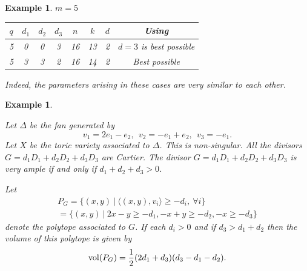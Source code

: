 \documentclass[12pt]{article}
\newtheorem{example}[theorem]{Example}
\begin{document}
\begin{example}
$m=5$ 

\begin{center}
\begin{tabular}{|c|c|c|c|c|c|c|c|}\hline
$q$ & $d_1$ & $d_2$ & $d_3$ & $n$ & $k$ & $d$ & Using \cite{B} \\ \hline
5    & 0  &  0 & 3  & 16  & 13 & 2 & $d=3$ is best possible  \\
5    & 3  &  3 & 2  & 16  & 14 & 2 & Best possible  \\
\hline
\end{tabular}
\end{center}

Indeed, the parameters arising in these cases are very similar
to each other.
\end{example}


\begin{example}
\label{example:fan6}

Let $\Delta$ be the fan generated by 
\[
v_1=2e_1-e_2,\ \ v_2=-e_1+e_2,\ \ v_3=-e_1.
\]
Let $X$ be the toric variety associated to $\Delta$.
This is non-singular.
All the divisors $G=d_1D_1+d_2D_2+d_3D_3$
are Cartier.
The divisor $G=d_1D_1+d_2D_2+d_3D_3$
is very ample if and only if $d_1+d_2+d_3>0$.

Let 
\[
\begin{array}{c}
P_G=\{(x,y)\ |\ \langle (x,y),v_i\rangle \geq -d_i, \ \forall i\}\\
=\{(x,y)\ |\ 2x-y \geq -d_1, -x+y \geq -d_2, -x \geq -d_3 
\}
\end{array}
\]
denote the polytope associated to $G$. 
If each $d_i>0$ and if $d_3>d_1+d_2$ then the volume of this polytope 
is given by
\[
{\rm vol}(P_G)=\frac{1}{2}(2d_1+d_3)(d_3-d_1-d_2).
\]


\end{example}
\end{document}
